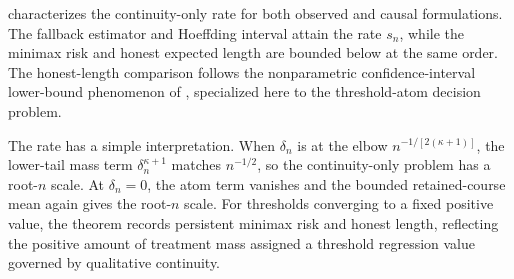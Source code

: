 
 characterizes the continuity-only rate for both observed and causal formulations. The fallback estimator and Hoeffding interval attain the rate \(s_n\), while the minimax risk and honest expected length are bounded below at the same order. The honest-length comparison follows the nonparametric confidence-interval lower-bound phenomenon of \citet{Low1997NonparametricConfidenceIntervals}, specialized here to the threshold-atom decision problem.

The rate has a simple interpretation. When \(\delta_n\) is at the elbow \(n^{-1/[2(\kappa+1)]}\), the lower-tail mass term \(\delta_n^{\kappa+1}\) matches \(n^{-1/2}\), so the continuity-only problem has a root-\(n\) scale. At \(\delta_n=0\), the atom term vanishes and the bounded retained-course mean again gives the root-\(n\) scale. For thresholds converging to a fixed positive value, the theorem records persistent minimax risk and honest length, reflecting the positive amount of treatment mass assigned a threshold regression value governed by qualitative continuity.

